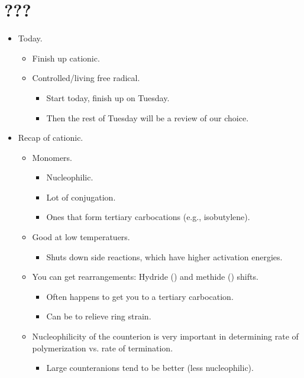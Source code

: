 \documentclass[../notes.tex]{subfiles}
\begin{document}
\section{???}
\begin{itemize}
    \item {}Today.
    \begin{itemize}
        \item Finish up cationic.
        \item Controlled/living free radical.
        \begin{itemize}
            \item Start today, finish up on Tuesday.
            \item Then the rest of Tuesday will be a review of our choice.
        \end{itemize}
    \end{itemize}
    \item Recap of cationic.
    \begin{itemize}
        \item Monomers.
        \begin{itemize}
            \item Nucleophilic.
            \item Lot of conjugation.
            \item Ones that form tertiary carbocations (e.g., isobutylene).
        \end{itemize}
        \item Good at low temperatuers.
        \begin{itemize}
            \item Shuts down side reactions, which have higher activation energies.
        \end{itemize}
        \item You can get rearrangements: Hydride () and methide () shifts.
        \begin{itemize}
            \item Often happens to get you to a tertiary carbocation.
            \item Can be to relieve ring strain.
        \end{itemize}
        \item Nucleophilicity of the counterion is very important in determining rate of polymerization vs. rate of termination.
        \begin{itemize}
            \item Large counteranions tend to be better (less nucleophilic).

\end{itemize}
\end{itemize}
\end{itemize}
\end{document}
